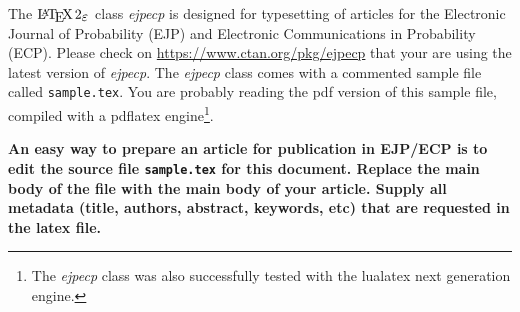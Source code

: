 \documentclass[ECP]{ejpecp} %
\begin{document}


The $\LaTeXe$ class \emph{ejpecp} is designed for typesetting of articles for
the Electronic Journal of Probability (EJP) and Electronic Communications in
Probability (ECP). Please check on \url{https://www.ctan.org/pkg/ejpecp} that
your are using the latest version of \emph{ejpecp}. The \emph{ejpecp} class
comes with a commented sample file called \texttt{sample.tex}. You are
probably reading the pdf version of this sample file, compiled with a pdflatex
engine\footnote{The \emph{ejpecp} class was also successfully tested with the lualatex next generation engine.}.

\textbf{An easy way to prepare an article for publication in EJP/ECP is to
  edit the source file \texttt{sample.tex} for this document. Replace the main
  body of the file with the main body of your article. Supply all metadata
  (title, authors, abstract, keywords, etc) that are requested in the latex
  file.}
\end{document}

